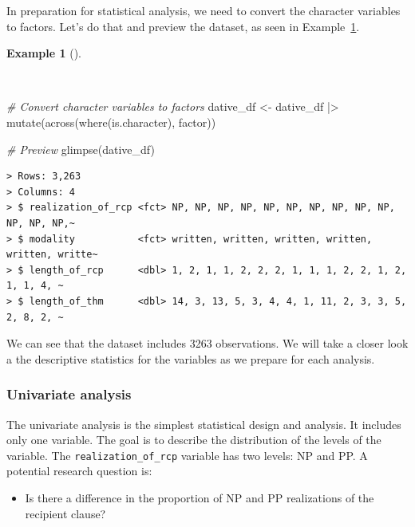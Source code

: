 \documentclass[
  letterpaper,
  DIV=11,
  numbers=noendperiod]{scrreprt}
\newenvironment{Shaded}{\begin{snugshade}}{\end{snugshade}}
\newcommand{\CommentTok}[1]{\textcolor[rgb]{0.00,0.00,0.00}{\textit{#1}}}
\newcommand{\FunctionTok}[1]{\textcolor[rgb]{0.00,0.00,0.00}{#1}}
\newcommand{\NormalTok}[1]{\textcolor[rgb]{0.00,0.00,0.00}{#1}}
\newcommand{\OtherTok}[1]{\textcolor[rgb]{0.00,0.00,0.00}{#1}}
\newcommand{\SpecialCharTok}[1]{\textcolor[rgb]{0.00,0.00,0.00}{#1}}
\providecommand{\tightlist}{%
  \setlength{\itemsep}{0pt}\setlength{\parskip}{0pt}}\usepackage{longtable,booktabs,array}
\theoremstyle{definition}
\newtheorem{example}{Example}[chapter]
\theoremstyle{remark}
\begin{document}
In preparation for statistical analysis, we need to convert the
character variables to factors. Let's do that and preview the dataset,
as seen in Example~\ref{exm-ida-cat-setup-factors}.

\begin{example}[]\protect\hypertarget{exm-ida-cat-setup-factors}{}\label{exm-ida-cat-setup-factors}

~

\begin{Shaded}
\begin{Highlighting}[]
\CommentTok{\# Convert character variables to factors}
\NormalTok{dative\_df }\OtherTok{\textless{}{-}}
\NormalTok{  dative\_df }\SpecialCharTok{|\textgreater{}}
  \FunctionTok{mutate}\NormalTok{(}\FunctionTok{across}\NormalTok{(}\FunctionTok{where}\NormalTok{(is.character), factor))}

\CommentTok{\# Preview}
\FunctionTok{glimpse}\NormalTok{(dative\_df)}
\end{Highlighting}
\end{Shaded}

\begin{verbatim}
> Rows: 3,263
> Columns: 4
> $ realization_of_rcp <fct> NP, NP, NP, NP, NP, NP, NP, NP, NP, NP, NP, NP, NP,~
> $ modality           <fct> written, written, written, written, written, writte~
> $ length_of_rcp      <dbl> 1, 2, 1, 1, 2, 2, 2, 1, 1, 1, 2, 2, 1, 2, 1, 1, 4, ~
> $ length_of_thm      <dbl> 14, 3, 13, 5, 3, 4, 4, 1, 11, 2, 3, 3, 5, 2, 8, 2, ~
\end{verbatim}

\end{example}

We can see that the dataset includes 3263 observations. We will take a
closer look a the descriptive statistics for the variables as we prepare
for each analysis.

\subsubsection{Univariate analysis}\label{sec-ida-cat-univariate}

The univariate analysis is the simplest statistical design and analysis.
It includes only one variable. The goal is to describe the distribution
of the levels of the variable. The \texttt{realization\_of\_rcp}
variable has two levels: NP and PP. A potential research question is:

\begin{itemize}
\tightlist
\item
  Is there a difference in the proportion of NP and PP realizations of
  the recipient clause?
\end{itemize}
\end{document}
